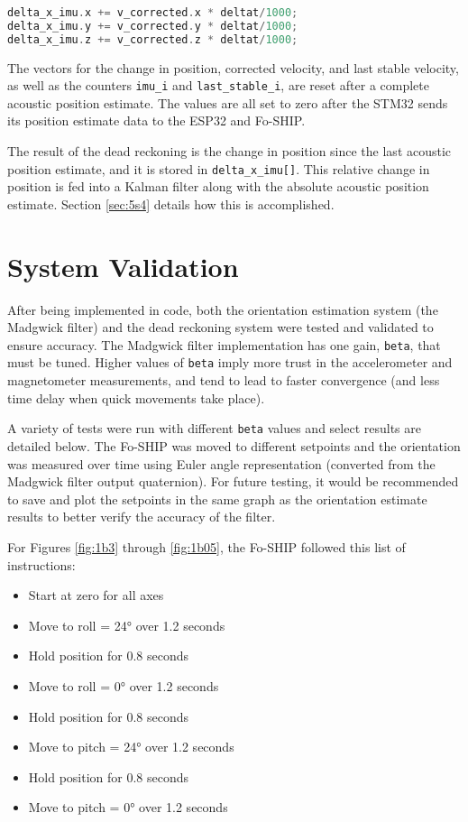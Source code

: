 \documentclass[11pt]{ucthesisCP}
\begin{document}
\begin{lstlisting}[language=C++]
delta_x_imu.x += v_corrected.x * deltat/1000;
delta_x_imu.y += v_corrected.y * deltat/1000;
delta_x_imu.z += v_corrected.z * deltat/1000;
\end{lstlisting}

The vectors for the change in position, corrected velocity, and last stable velocity, as well as the counters \verb|imu_i| and \verb|last_stable_i|, are reset after a complete acoustic position estimate. The values are all set to zero after the STM32 sends its position estimate data to the ESP32 and Fo-SHIP.

The result of the dead reckoning is the change in position since the last acoustic position estimate, and it is stored in \verb|delta_x_imu[]|. This relative change in position is fed into a Kalman filter along with the absolute acoustic position estimate. Section \ref{sec:5s4} details how this is accomplished.

\section{System Validation} \label{sec:4s6}
After being implemented in code, both the orientation estimation system (the Madgwick filter) and the dead reckoning system were tested and validated to ensure accuracy. The Madgwick filter implementation has one gain, \verb|beta|, that must be tuned. Higher values of \verb|beta| imply more trust in the accelerometer and magnetometer measurements, and tend to lead to faster convergence (and less time delay when quick movements take place).

A variety of tests were run with different \verb|beta| values and select results are detailed below. The Fo-SHIP was moved to different setpoints and the orientation was measured over time using Euler angle representation (converted from the Madgwick filter output quaternion). For future testing, it would be recommended to save and plot the setpoints in the same graph as the orientation estimate results to better verify the accuracy of the filter.

For Figures \ref{fig:1b3} through \ref{fig:1b05}, the Fo-SHIP followed this list of instructions:
\begin{itemize}[noitemsep,topsep=0pt,]
\item Start at zero for all axes
\item Move to roll = 24° over 1.2 seconds
\item Hold position for 0.8 seconds
\item Move to roll = 0° over 1.2 seconds
\item Hold position for 0.8 seconds
\item Move to pitch = 24° over 1.2 seconds
\item Hold position for 0.8 seconds
\item Move to pitch = 0° over 1.2 seconds
\end{itemize}
\end{document}
